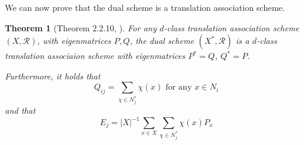 \documentclass[a4paper,12pt]{article}
\theoremstyle{plain}
\newtheorem{theorem}{Theorem}
\theoremstyle{definition}
\theoremstyle{remark}
\begin{document}
We can now prove that the dual scheme is a translation association scheme.

\begin{theorem}[Theorem 2.2.10, \cite{brouwer_distance-regular_1989}]
    For any $ d $-class translation association scheme $ (X,\mathcal{R}) $, with
    eigenmatrices $ P,Q $, the dual scheme $ (X^*, \mathcal{R}) $ is a $ d $-class
    translation associaion scheme with eigenmatrices $ P^* = Q $, $ Q^* = P $.

    Furthermore, it holds that
    \begin{equation}
        Q_{ij} = \sum_{ \chi \in N_j^* } \chi(x) \text{ for any } x \in N_i
        \label{eq:qval_sum_char}
    \end{equation}
    and that
    \begin{equation}
        E_j = |X|^{-1} \sum_{ x \in X } \sum_{ \chi \in N_j^* } \chi(x)P_x
        \label{eq:Ej_perm_mat_sum}
    \end{equation}
    \label{th:tas_dual}
\end{theorem}
\end{document}
